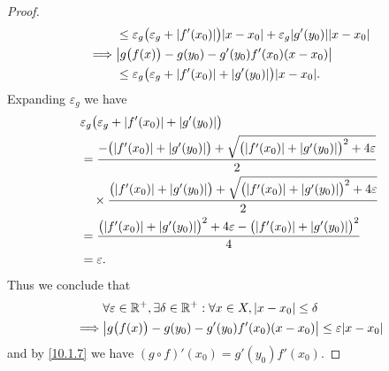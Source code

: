 \begin{proof}
\begin{align*}
             & \leq \varepsilon_g \big(\varepsilon_g + \abs{f'(x_0)}\big) \abs{x - x_0} + \varepsilon_g \abs{g'(y_0)} \abs{x - x_0} \\
    \implies & \abs{g\big(f(x)\big) - g(y_0) - g'(y_0) f'(x_0) (x - x_0)}                                                           \\
             & \leq \varepsilon_g \big(\varepsilon_g + \abs{f'(x_0)} + \abs{g'(y_0)}\big) \abs{x - x_0}.
  \end{align*}
  Expanding \(\varepsilon_g\) we have
  \begin{align*}
     & \varepsilon_g \big(\varepsilon_g + \abs{f'(x_0)} + \abs{g'(y_0)}\big)                                                              \\
     & = \dfrac{-\big(\abs{f'(x_0)} + \abs{g'(y_0)}\big) + \sqrt{\big(\abs{f'(x_0)} + \abs{g'(y_0)}\big)^2 + 4 \varepsilon}}{2}           \\
     & \quad \times \dfrac{\big(\abs{f'(x_0)} + \abs{g'(y_0)}\big) + \sqrt{\big(\abs{f'(x_0)} + \abs{g'(y_0)}\big)^2 + 4 \varepsilon}}{2} \\
     & = \dfrac{\big(\abs{f'(x_0)} + \abs{g'(y_0)}\big)^2 + 4 \varepsilon - \big(\abs{f'(x_0)} + \abs{g'(y_0)}\big)^2}{4}                 \\
     & = \varepsilon.
  \end{align*}
  Thus we conclude that
  \begin{align*}
             & \forall \varepsilon \in \R^+, \exists \delta \in \R^+ : \forall x \in X, \abs{x - x_0} \leq \delta \\
    \implies & \abs{g\big(f(x)\big) - g(y_0) - g'(y_0) f'(x_0) (x - x_0)} \leq \varepsilon \abs{x - x_0}
  \end{align*}
  and by \cref{10.1.7} we have \((g \circ f)'(x_0) = g'(y_0) f'(x_0)\).
\end{proof}

